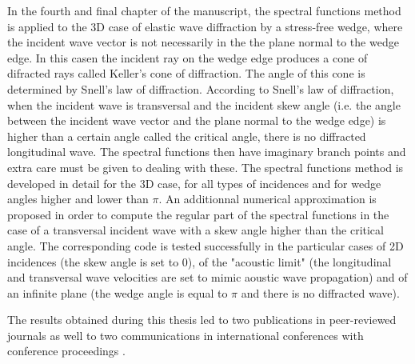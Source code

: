 In the fourth and final chapter of the manuscript, the spectral functions method is applied to the 3D case of elastic wave diffraction by a stress-free wedge, where the incident wave vector is not necessarily in the the plane normal to the wedge edge. In this casen the incident ray on the wedge edge produces a cone of difracted rays called Keller's cone of diffraction. The angle of this cone is determined by Snell's law of diffraction. According to Snell's law of diffraction, when the incident wave is transversal and the incident skew angle (i.e. the angle between the incident wave vector and the plane normal to the wedge edge) is higher than a certain angle called the critical angle, there is no diffracted longitudinal wave. The spectral functions then have imaginary branch points and extra care must be given to dealing with these. The spectral functions method is developed in detail for the 3D case, for all types of incidences and for wedge angles higher and lower than $\pi$. An additionnal numerical approximation is proposed in order to compute the regular part of the spectral functions in the case of a transversal incident wave with a skew angle higher than the critical angle. The corresponding code is tested successfully in the particular cases of 2D incidences (the skew angle is set to $0$), of the "acoustic limit" (the longitudinal and transversal wave velocities are set to mimic aoustic wave propagation) and of an infinite plane (the wedge angle is equal to $\pi$ and there is no diffracted wave).

The results obtained during this thesis led to two publications in peer-reviewed journals \cite{article, articleelasto} as well to two communications in international conferences with conference proceedings \cite{DD2018,AFPAC}.

